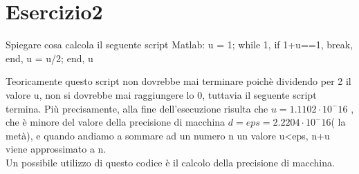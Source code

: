 \section{Esercizio2}
Spiegare cosa calcola il seguente script Matlab:
u = 1; while 1, if 1+u==1, break, end, u = u/2; end, u

Teoricamente questo script non dovrebbe mai terminare poichè dividendo per 2 il valore u, non si dovrebbe mai raggiungere lo 0, tuttavia il seguente script termina. Più precisamente, alla fine dell'esecuzione  risulta che $u = 1.1102\cdot10^-16$ , che è minore del valore della precisione di macchina $d = eps = 2.2204\cdot10^-16$( la metà), e quando andiamo a sommare ad un numero n un valore u<eps, n+u viene approssimato a n.\\
Un possibile utilizzo di questo codice è il calcolo della precisione di macchina.